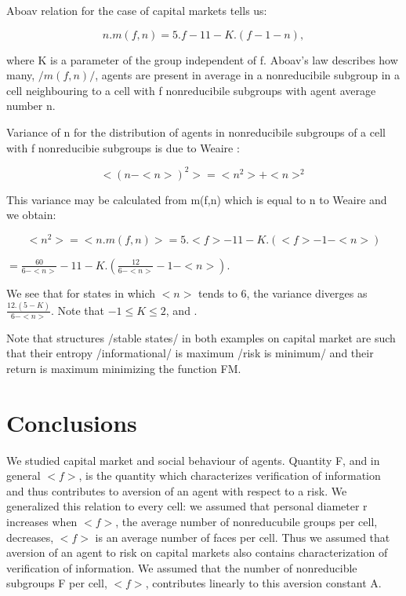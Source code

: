 \documentclass[10pt]{article}
\begin{document}
Aboav relation \cite{4} for the case of capital markets tells us:

\begin{equation}
\label{9}
n.m(f,n)= 5.f - 11 - K.(f - 1 - n),
\end{equation}

where K is a parameter of the group independent of f. Aboav's law describes how many, $/m(f,n)/$, agents are
present in average in a nonreducibile subgroup in a cell neighbouring to a cell with f nonreducibile subgroups with agent average number n.

Variance of n for the distribution of agents in nonreducibile subgroups of a cell with f nonreducibie subgroups is due to Weaire \cite{4}:

\begin{equation}
\label{10}
<(n - <n>)^{2}> = <n^{2}> + <n>^{2}
\end{equation}

This variance may be calculated from m(f,n) which is equal to n \cite{4} to Weaire and we obtain:

\begin{equation}
\label{11}
<n^{2}> = <n.m(f,n)> = 5.<f> - 11 - K.(<f> - 1 - <n>)
\end{equation}

\begin{center}
$= \frac{60}{6 - <n>} - 11 - K.(\frac{12}{6 - <n>} - 1 - <n>)$.
\end{center}

We see that for states in which $<n>$ tends to 6, the variance diverges as  $ \frac{12.(5-K)}{6 - <n>}$.
Note that $- 1 \leq K \leq 2$, \cite{3} and \cite{4}.


Note that structures /stable states/ in both examples on capital market are such that their entropy /informational/ is maximum /risk is minimum/ and their return is maximum minimizing the function FM.

\section{Conclusions}

We studied capital market and social behaviour of agents. Quantity F, and in general $<f>$, is the
quantity which characterizes verification of information and thus contributes to aversion of an agent with respect to a risk. We generalized this relation to every cell: we assumed that personal diameter r increases when $<f>$, the average number of nonreducubile groups per cell, decreases, $<f>$ is an average number of faces per cell. Thus we assumed that aversion of an agent to risk on capital markets also contains characterization of verification of information. We assumed that the number of nonreducible subgroups F per cell, $<f>$, contributes linearly to this aversion constant A.
\end{document}
